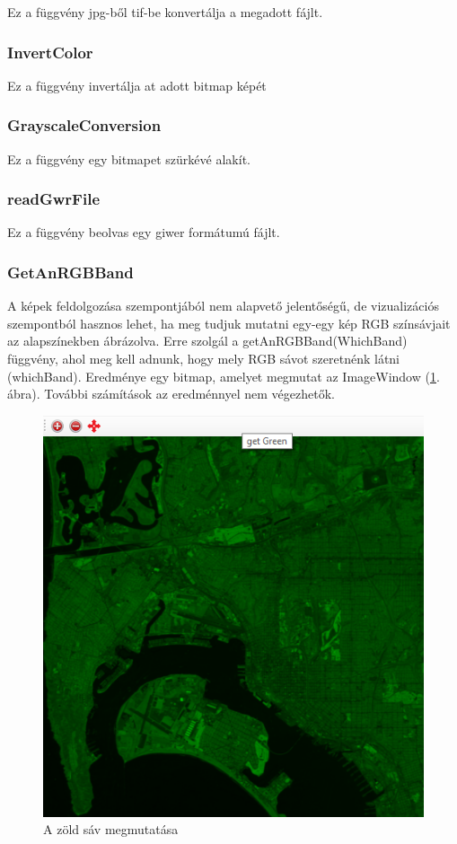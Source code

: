 \documentclass[a4paper,12pt]{article}
\begin{document}
Ez a függvény jpg-ből tif-be konvertálja a megadott fájlt.

\subsubsection{InvertColor}

Ez a függvény invertálja at adott bitmap képét

\subsubsection{GrayscaleConversion}

Ez a függvény egy bitmapet szürkévé alakít.

\subsubsection{readGwrFile}

Ez a függvény beolvas egy giwer formátumú fájlt.



\subsubsection{GetAnRGBBand}

A képek feldolgozása szempontjából nem alapvető jelentőségű, de vizualizációs szempontból hasznos lehet, ha meg tudjuk mutatni egy-egy kép RGB színsávjait az alapszínekben ábrázolva. Erre szolgál a getAnRGBBand(WhichBand) függvény, ahol meg kell adnunk, hogy mely RGB sávot szeretnénk látni (whichBand). Eredménye egy bitmap, amelyet megmutat az ImageWindow (\ref{fig:redBand}. ábra). További számítások az eredménnyel nem végezhetők.

\begin{figure}
	\centering
	\includegraphics[width=12cm]{redBand.png}
	\caption{A zöld sáv megmutatása}
	\label{fig:redBand}
\end{figure}
\end{document}
